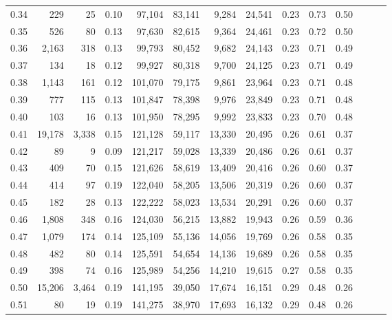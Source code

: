 \begin{tabular}{rrrrrrrrrrrrrr}
0.34 &     229 &     25 &  0.10 &   97,104 &   83,141 &   9,284 &  24,541 &  0.23 &  0.73 &      0.50 \\
0.35 &     526 &     80 &  0.13 &   97,630 &   82,615 &   9,364 &  24,461 &  0.23 &  0.72 &      0.50 \\
0.36 &   2,163 &    318 &  0.13 &   99,793 &   80,452 &   9,682 &  24,143 &  0.23 &  0.71 &      0.49 \\
0.37 &     134 &     18 &  0.12 &   99,927 &   80,318 &   9,700 &  24,125 &  0.23 &  0.71 &      0.49 \\
0.38 &   1,143 &    161 &  0.12 &  101,070 &   79,175 &   9,861 &  23,964 &  0.23 &  0.71 &      0.48 \\
0.39 &     777 &    115 &  0.13 &  101,847 &   78,398 &   9,976 &  23,849 &  0.23 &  0.71 &      0.48 \\
0.40 &     103 &     16 &  0.13 &  101,950 &   78,295 &   9,992 &  23,833 &  0.23 &  0.70 &      0.48 \\
0.41 &  19,178 &  3,338 &  0.15 &  121,128 &   59,117 &  13,330 &  20,495 &  0.26 &  0.61 &      0.37 \\
0.42 &      89 &      9 &  0.09 &  121,217 &   59,028 &  13,339 &  20,486 &  0.26 &  0.61 &      0.37 \\
0.43 &     409 &     70 &  0.15 &  121,626 &   58,619 &  13,409 &  20,416 &  0.26 &  0.60 &      0.37 \\
0.44 &     414 &     97 &  0.19 &  122,040 &   58,205 &  13,506 &  20,319 &  0.26 &  0.60 &      0.37 \\
0.45 &     182 &     28 &  0.13 &  122,222 &   58,023 &  13,534 &  20,291 &  0.26 &  0.60 &      0.37 \\
0.46 &   1,808 &    348 &  0.16 &  124,030 &   56,215 &  13,882 &  19,943 &  0.26 &  0.59 &      0.36 \\
0.47 &   1,079 &    174 &  0.14 &  125,109 &   55,136 &  14,056 &  19,769 &  0.26 &  0.58 &      0.35 \\
0.48 &     482 &     80 &  0.14 &  125,591 &   54,654 &  14,136 &  19,689 &  0.26 &  0.58 &      0.35 \\
0.49 &     398 &     74 &  0.16 &  125,989 &   54,256 &  14,210 &  19,615 &  0.27 &  0.58 &      0.35 \\
0.50 &  15,206 &  3,464 &  0.19 &  141,195 &   39,050 &  17,674 &  16,151 &  0.29 &  0.48 &      0.26 \\
0.51 &      80 &     19 &  0.19 &  141,275 &   38,970 &  17,693 &  16,132 &  0.29 &  0.48 &      0.26 \\

\end{tabular}
